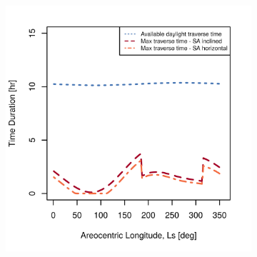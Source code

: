 \begin{figure}[h]
\captionsetup[subfigure]{justification=centering}
\vspace{-2ex}
	\centering
    \setlength{\subfigureWidth}{0.50\textwidth}
    \setlength{\graphicsHeight}{80mm}
    \hypersetup{hidelinks=true}%
    \begin{subfigure}[t]{\subfigureWidth}
        \centering
        \includegraphics[height=\graphicsHeight]{sections/design/solar-array/plots/ianichaos-75w-max-traverse-durations-for-solar-cell-coverage-area-15m2.png}
		\label{fig:plot:sub:final-maximum-traverse-durations-iani-chaos}
    \end{subfigure}\hfill
    \begin{subfigure}[t]{\subfigureWidth}
        \centering

\end{subfigure}
\end{figure}
